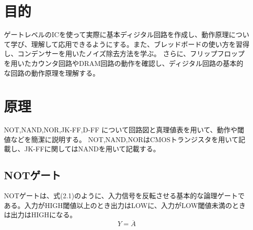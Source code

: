 \documentclass{jlreq}
\numberwithin{equation}{section}
\begin{document}
\section{目的}
ゲートレベルのICを使って実際に基本ディジタル回路を作成し、動作原理について学び、理解して応用できるようにする。また、ブレッドボードの使い方を習得し、コンデンサーを用いたノイズ除去方法を学ぶ。
さらに、フリップフロップを用いたカウンタ回路やDRAM回路の動作を確認し、ディジタル回路の基本的な回路の動作原理を理解する。

\section{原理}
NOT,NAND,NOR,JK-FF,D-FF について回路図と真理値表を用いて、動作や閾値などを簡潔に説明する。
NOT,NAND,NORはCMOSトランジスタを用いて記載し、JK-FFに関してはNANDを用いて記載する。

\subsection{NOTゲート}
NOTゲートは、式(2.1)のように、入力信号を反転させる基本的な論理ゲートである。入力がHIGH閾値以上のとき出力はLOWに、入力がLOW閾値未満のときは出力はHIGHになる。
\begin{equation}
  Y = \overline{A}
\end{equation}
\end{document}

